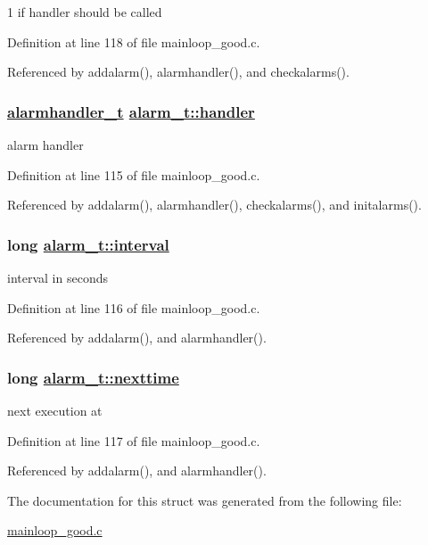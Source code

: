 1 if handler should be called 



Definition at line 118 of file mainloop\_\-good.c.

Referenced by addalarm(), alarmhandler(), and checkalarms().\hypertarget{structalarm__t_o0}{
\subsubsection[handler]{\setlength{\rightskip}{0pt plus 5cm}\hyperlink{mainloop__good_8c_a21}{alarmhandler\_\-t} \hyperlink{structalarm__t_o0}{alarm\_\-t::handler}}}
\label{structalarm__t_o0}


alarm handler 



Definition at line 115 of file mainloop\_\-good.c.

Referenced by addalarm(), alarmhandler(), checkalarms(), and initalarms().\hypertarget{structalarm__t_o1}{
\subsubsection[interval]{\setlength{\rightskip}{0pt plus 5cm}long \hyperlink{structalarm__t_o1}{alarm\_\-t::interval}}}
\label{structalarm__t_o1}


interval in seconds 



Definition at line 116 of file mainloop\_\-good.c.

Referenced by addalarm(), and alarmhandler().\hypertarget{structalarm__t_o2}{
\subsubsection[nexttime]{\setlength{\rightskip}{0pt plus 5cm}long \hyperlink{structalarm__t_o2}{alarm\_\-t::nexttime}}}
\label{structalarm__t_o2}


next execution at 



Definition at line 117 of file mainloop\_\-good.c.

Referenced by addalarm(), and alarmhandler().

The documentation for this struct was generated from the following file:\begin{CompactItemize}
\item 
\hyperlink{mainloop__good_8c}{mainloop\_\-good.c}\end{CompactItemize}
